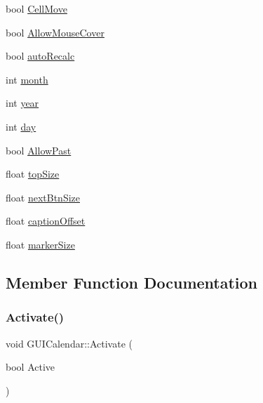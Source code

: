 \begin{DoxyCompactItemize}
\item 
bool \hyperlink{class_g_u_i_calendar_ab4c2b4b2b9669d835840598d8d9369b3}{Cell\+Move}
\item 
bool \hyperlink{class_g_u_i_calendar_ab568256e1946305f1e64b79eccd46ab4}{Allow\+Mouse\+Cover}
\item 
bool \hyperlink{class_g_u_i_calendar_ac53d7cfe00fd27efd4cc1be6672884d0}{auto\+Recalc}
\item 
int \hyperlink{class_g_u_i_calendar_a9fdf49f15244c7e0c6d386d33835f4f0}{month}
\item 
int \hyperlink{class_g_u_i_calendar_ab3d9a88e28a1f1a509796b554a922233}{year}
\item 
int \hyperlink{class_g_u_i_calendar_a1ed661850524a4400fcfd7c1492343e7}{day}
\item 
bool \hyperlink{class_g_u_i_calendar_aef7dc09b05deedefa98729133e67e0b8}{Allow\+Past}
\item 
float \hyperlink{class_g_u_i_calendar_aeff1246717e236d7167f4b04c7b0078a}{top\+Size}
\item 
float \hyperlink{class_g_u_i_calendar_ab31aed4d5b6e1da8870bb4afee5c12cd}{next\+Btn\+Size}
\item 
float \hyperlink{class_g_u_i_calendar_ac1c51ed46b3effe677b7a663592fd9df}{caption\+Offset}
\item 
float \hyperlink{class_g_u_i_calendar_a6a5cb7f0343a44126f62e65b57821766}{marker\+Size}
\end{DoxyCompactItemize}


\subsection{Member Function Documentation}
\hypertarget{class_g_u_i_calendar_a809de54fe302cb780c12378de281a029}{}\label{class_g_u_i_calendar_a809de54fe302cb780c12378de281a029} 
\subsubsection{\texorpdfstring{Activate()}{Activate()}}
{\footnotesize\ttfamily void G\+U\+I\+Calendar\+::\+Activate (\begin{DoxyParamCaption}\item[{bool}]{Active }\end{DoxyParamCaption})}

\hypertarget{class_g_u_i_calendar_ae2ffe7ea45c68a0c5e74e4320fbff7a2}{}\label{class_g_u_i_calendar_ae2ffe7ea45c68a0c5e74e4320fbff7a2} 
